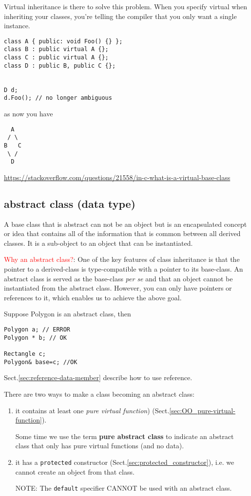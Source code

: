 Virtual inheritance is there to solve this problem. When you specify virtual
when inheriting your classes, you're telling the compiler that you only want a
single instance.
\begin{lstlisting}
class A { public: void Foo() {} };
class B : public virtual A {};
class C : public virtual A {};
class D : public B, public C {};


D d;
d.Foo(); // no longer ambiguous
\end{lstlisting}
as now you have
\begin{verbatim}
  A
 / \
B   C
 \ /
  D
\end{verbatim}

\url{https://stackoverflow.com/questions/21558/in-c-what-is-a-virtual-base-class}

\subsection{abstract class (data type)}
\label{sec:abstract_class_C++}

A base class that is abstract can not be an object but is an encapsulated
concept or idea that contains all of the information that is common between all
derived classes. It is a sub-object to an object that can be instantiated.
 

\textcolor{red}{Why an abstract class?}: One of the key features of class
inheritance is that the pointer to a derived-class is type-compatible with a
pointer to its base-class. An abstract class is served as the base-class {\it
per se} and that an object cannot be instantiated from the abstract class.
However, you can only have pointers or references to it, which enables us to
achieve the above goal.

Suppose Polygon is an abstract class, then
\begin{verbatim}
Polygon a; // ERROR
Polygon * b; // OK

Rectangle c;
Polygon& base=c; //OK
\end{verbatim}
Sect.\ref{sec:reference-data-member} describe how to use reference.

There are two ways to make a class becoming an abstract class:
\begin{enumerate}
  
  \item it contains at least one {\it pure virtual function})
  (Sect.\ref{sec:OO_pure-virtual-function}).

Some time we use the term {\bf pure abstract class} to indicate an abstract
class that only has pure virtual functions (and no data).
  
  \item it has a \verb!protected! constructor
  (Sect.\ref{sec:protected_constructor}), i.e. we cannot create an object from
  that class.

  NOTE:  The \verb!default! specifier CANNOT be used with an abstract class.
\end{enumerate}


